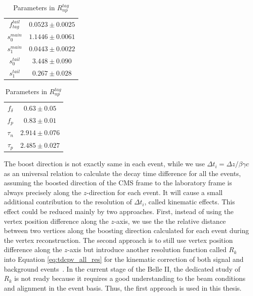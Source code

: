 \begin{table}[H]
	\begin{minipage}[b]{0.5\linewidth}
		\centering
		\caption{Parameters in $R^{tag}_{det}$}
		\label{tab:Rtagdet}
		\begin{tabular}{|c|c|}
			\hline
			$f_{tag}^{tail}$ & $0.0523 \pm 0.0025$\\
			$s_0^{main}$&  $1.1446 \pm 0.0061$ \\
			$s_1^{main}$ & $0.0443\pm 0.0022$\\
			$s_0^{tail}$ &  $3.448\pm 0.090$\\
			$s_1^{tail}$  & $0.267\pm0.028$ \\
			\hline
		\end{tabular}
	\end{minipage}
	\begin{minipage}[b]{0.5\linewidth}
		\centering
		\caption{Parameters in $R^{tag}_{np}$}
		\label{tab:Rtagnp}
		\begin{tabular}{|c|c|}
			\hline
			$f_{\delta}$ & $0.63\pm 0.05$\\
			$f_p$ &  $0.83 \pm 0.01$ \\
			$\tau_n$ & $2.914\pm 0.076$\\
			$\tau_p$ &  $2.485\pm 0.027$\\
			\hline
		\end{tabular}
	\end{minipage}
\end{table}

The boost direction is not exactly same in each event, while we use $\Delta t_i = \Delta z / \beta\gamma c$ as an universal relation to calculate the decay time difference for all the events, assuming the boosted direction of the CMS frame to the laboratory frame is always precisely along the $z$-direction for each event. It will cause a small additional contribution to the resolution of $\Delta t_i$, called kinematic effects. This effect could be reduced mainly by two approaches. First, instead of using the vertex position difference along the $z$-axis, we use the the relative distance between two vertices along the boosting direction calculated for each event during the vertex reconstruction. The second approach is to still use vertex position difference along the $z$-axis but introduce another resolution function called $R_k$ into Equation \ref{eq:tdcpv_all_res} for the kinematic correction of both signal and background events~\cite{tajima2004proper}. 
In the current stage of the Belle II, the dedicated study of $R_k$ is not ready because it requires a good understanding to the beam conditions and alignment in the event basis. Thus, the first approach is used in this thesis. 



